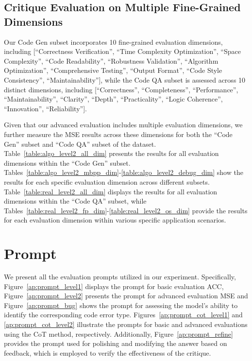 \documentclass[11pt, a4paper, logo, copyright, nonumbering, amsart]{map}
\begin{document}
\begin{CJK*}{UTF8}{gbsn}
\subsection{Critique Evaluation on Multiple Fine-Grained Dimensions} \label{ap:main_dimension}

Our Code Gen subset incorporates 10 fine-grained evaluation dimensions, including [``Correctness Verification'', ``Time Complexity Optimization'', ``Space Complexity'', ``Code Readability'', ``Robustness Validation'', ``Algorithm Optimization'', ``Comprehensive Testing'', ``Output Format'', ``Code Style Consistency'', ``Maintainability''], while the Code QA subset is assessed across 10 distinct dimensions, including [``Correctness'', ``Completeness'', ``Performance'', ``Maintainability'', ``Clarity'', ``Depth'', ``Practicality'', ``Logic Coherence'', ``Innovation'', ``Reliability'']. 

Given that our advanced evaluation includes multiple evaluation dimensions, we further measure the MSE results across these dimensions for both the ``Code Gen'' subset and ``Code QA'' subset of the dataset. Table~\ref{table:algo_level2_all_dim} presents the results for all evaluation dimensions within the ``Code Gen'' subset. Tables~\ref{table:algo_level2_mbpp_dim}-\ref{table:algo_level2_debug_dim} show the results for each specific evaluation dimension across different subsets. Table~\ref{table:real_level2_all_dim} displays the results for all evaluation dimensions within the ``Code QA'' subset, while Tables~\ref{table:real_level2_fp_dim}-\ref{table:real_level2_os_dim} provide the results for each evaluation dimension within various specific application scenarios.

\section{Prompt} \label{ap:prompt}

We present all the evaluation prompts utilized in our experiment. Specifically, Figure~\ref{ap:prompt_level1} displays the prompt for basic evaluation ACC, Figure~\ref{ap:prompt_level2} presents the prompt for advanced evaluation MSE and Figure~\ref{ap:prompt_bug} shows the prompt for assessing the model's ability to identify the corresponding code error type. Figures~\ref{ap:prompt_cot_level1} and \ref{ap:prompt_cot_level2} illustrate the prompts for basic and advanced evaluations using the CoT method, respectively. Additionally, Figure~\ref{ap:prompt_refine} provides the prompt used for polishing and modifying the answer based on feedback, which is employed to verify the effectiveness of the critique.


\end{CJK*}
\end{document}
